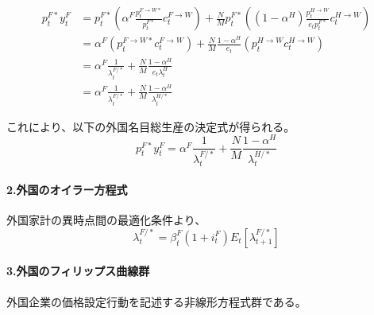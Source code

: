 \begin{align}
p_t^{F*}y_t^F&=p_t^{F*}\left(\alpha^F\frac{p_t^{F\to W*}}{p_t^{F*}}c_t^{F\to W}\right)+\frac{N}{M}p_t^{F*}\left((1-\alpha^H)\frac{p_t^{H\to W}}{e_tp_t^{F*}}c_t^{H\to W}\right) \label{eq:appendix_insulation_effect_core_market_clearing_nom_demand_step1} \\
&=\alpha^F(p_t^{F\to W*}c_t^{F\to W})+\frac{N}{M}\frac{1-\alpha^H}{e_t}(p_t^{H\to W}c_t^{H\to W}) \label{eq:appendix_insulation_effect_core_market_clearing_nom_demand_step2} \\
&=\alpha^F\frac{1}{\lambda_t^{F/*}}+\frac{N}{M}\frac{1-\alpha^H}{e_t\lambda_t^H} \label{eq:appendix_insulation_effect_core_market_clearing_nom_demand_step3} \\
&=\alpha^F\frac{1}{\lambda_t^{F/*}}+\frac{N}{M}\frac{1-\alpha^H}{\lambda_t^{H/*}}
\label{eq:appendix_insulation_effect_core_market_clearing_nom_demand_final}
\end{align}

これにより、以下の外国名目総生産の決定式が得られる。
\begin{equation}
    p_t^{F*}y_t^F=\alpha^F\frac{1}{\lambda_t^{F/*}}+\frac{N}{M}\frac{1-\alpha^H}{\lambda_t^{H/*}}
    \label{eq:appendix_insulation_effect_core_market_clearing_nom_final}
\end{equation}

\paragraph{2.外国のオイラー方程式}
\label{sec:appendix_insulation_effect_core_euler}

外国家計の異時点間の最適化条件より、
\begin{equation}
\lambda_t^{F/*}=\beta_t^F(1+i_t^F)E_t[\lambda_{t+1}^{F/*}]
\label{eq:appendix_insulation_effect_core_euler_final}
\end{equation}

\paragraph{3.外国のフィリップス曲線群}
\label{sec:appendix_insulation_effect_core_phillips}

外国企業の価格設定行動を記述する非線形方程式群である。

